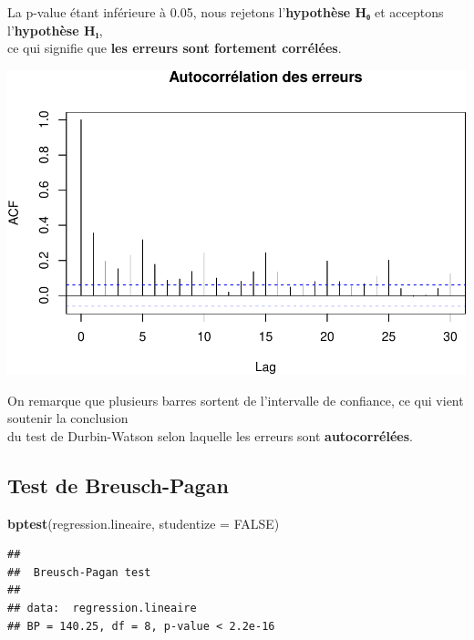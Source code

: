 \documentclass[
  12pt,
]{article}
\newenvironment{Shaded}{\begin{snugshade}}{\end{snugshade}}
\newcommand{\AttributeTok}[1]{\textcolor[rgb]{0.13,0.29,0.53}{#1}}
\newcommand{\ConstantTok}[1]{\textcolor[rgb]{0.56,0.35,0.01}{#1}}
\newcommand{\FunctionTok}[1]{\textcolor[rgb]{0.13,0.29,0.53}{\textbf{#1}}}
\newcommand{\NormalTok}[1]{#1}
\newcommand{\SpecialCharTok}[1]{\textcolor[rgb]{0.81,0.36,0.00}{\textbf{#1}}}
\newcommand{\StringTok}[1]{\textcolor[rgb]{0.31,0.60,0.02}{#1}}
\begin{document}
La p-value étant inférieure à 0.05, nous rejetons l'\textbf{hypothèse
H₀} et acceptons l'\textbf{hypothèse H₁},\\
ce qui signifie que \textbf{les erreurs sont fortement corrélées}.

\begin{Shaded}
\end{Shaded}

\includegraphics{rmd_final_files/figure-latex/unnamed-chunk-21-1.pdf}

On remarque que plusieurs barres sortent de l'intervalle de confiance,
ce qui vient soutenir la conclusion\\
du test de Durbin-Watson selon laquelle les erreurs sont
\textbf{autocorrélées}.

\subsection{Test de Breusch-Pagan}\label{test-de-breusch-pagan}

\begin{Shaded}
\begin{Highlighting}[]
\FunctionTok{bptest}\NormalTok{(regression.lineaire, }\AttributeTok{studentize =} \ConstantTok{FALSE}\NormalTok{)}
\end{Highlighting}
\end{Shaded}

\begin{verbatim}
## 
##  Breusch-Pagan test
## 
## data:  regression.lineaire
## BP = 140.25, df = 8, p-value < 2.2e-16
\end{verbatim}
\end{document}
